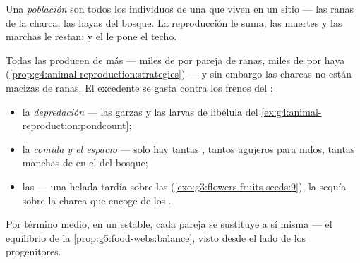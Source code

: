 \begin{definition}[Población]\label{def:g8:reproduction-and-environment:population}
Una \emph{población} son todos los individuos de una
 que viven en un sitio --- las ranas de la charca, las hayas del
bosque. La reproducción le suma; las muertes y las marchas le restan; y
el  le pone el techo.
\end{definition}

\begin{proposition}\label{prop:g8:reproduction-and-environment:limits}
Todas las  producen de más --- miles de  por pareja de
ranas, miles de  por haya
(\cref{prop:g4:animal-reproduction:strategies}) --- y sin embargo las
charcas no están macizas de ranas. El excedente se gasta contra los
frenos del :
\begin{itemize}
  \item la \emph{depredación} --- las garzas y las larvas de libélula
        del \cref{ex:g4:animal-reproduction:pondcount};
  \item la \emph{comida y el espacio} --- solo hay tantas ,
        tantos agujeros para nidos, tantas manchas de  en el 
        del bosque;
  \item las \emph{} --- una helada tardía sobre las 
        (\cref{exo:g3:flowers-fruits-seeds:9}), la sequía sobre la
        charca que encoge de los .
\end{itemize}
Por término medio, en un  estable, cada pareja se sustituye a sí
misma --- el equilibrio de la \cref{prop:g5:food-webs:balance}, visto
desde el lado de los progenitores.
\end{proposition}
\admitted

